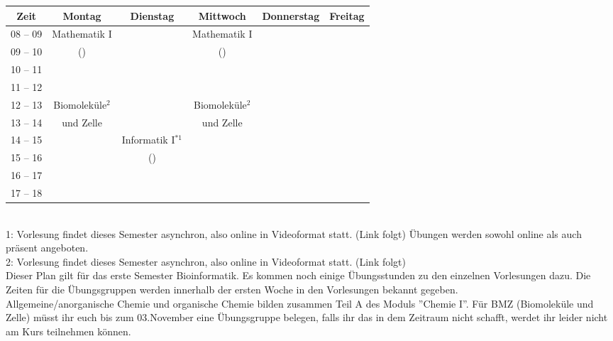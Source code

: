 \begin{minipage}{\textwidth}
    \footnotesize
\begin{tabular}{|c|c|c|c|c|c|} \hline
Zeit      & 		Montag 		& Dienstag			& Mittwoch 			& Donnerstag 			& Freitag\\\hline\hline
08 -- 09  & 		Mathematik I 	&  				& Mathematik I 		        &  				&\\\cline{1-1}\cline{3-3}\cline{5-6}
09 -- 10  & 		(\Matheprof)    &   				 & (\Matheprof)                 &  				&\\\hline
10 -- 11  &				&				&				&				&\\\hline
11 -- 12 & 				&  				&				&  			        &\\\hline
12 -- 13 & 		Biomoleküle$^2$	&  	                        & Biomoleküle$^2$    & 			            		&  \\\cline{1-1}\cline{3-3}\cline{5-6}
13 -- 14 & 		und Zelle       & 		                & und Zelle           & 					&  \\\hline
14 -- 15 & 				& Informatik I$^{*1}$ &                				&  				& \\\cline{1-2}\cline{4-6}
15 -- 16 &			                & (\Infoprof) 	    & 					& 				&\\\cline{1-3} \cline{5-6}
16 -- 17 & & & & &\\\hline
17 -- 18 & & & & & \\\hline
\end{tabular}
\end{minipage}
\\
1: Vorlesung findet dieses Semester asynchron, also online in Videoformat statt. (Link folgt) Übungen werden sowohl online als auch präsent angeboten.\\
2: Vorlesung findet dieses Semester asynchron, also online in Videoformat statt. (Link folgt)
\\
Dieser Plan gilt für das erste Semester Bioinformatik. Es kommen noch einige Übungsstunden
zu den einzelnen Vorlesungen dazu. Die Zeiten für die Übungsgruppen werden innerhalb der ersten Woche in den Vorlesungen bekannt gegeben.\\
Allgemeine/anorganische Chemie und organische Chemie bilden zusammen Teil A des Moduls ''Chemie I''.
Für BMZ (Biomoleküle und Zelle) müsst ihr euch bis zum 03.November eine Übungsgruppe belegen, falls ihr das in dem Zeitraum nicht schafft, werdet ihr leider nicht am Kurs teilnehmen können.


